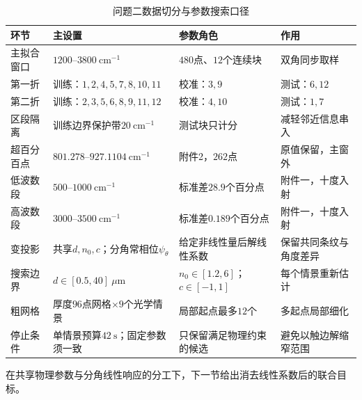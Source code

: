 \begingroup
\scriptsize
\setlength{\tabcolsep}{2pt}
\begin{longtable}{>{\centering\arraybackslash}p{} >{\centering\arraybackslash}p{} >{\centering\arraybackslash}p{} >{\centering\arraybackslash}p{}}
\caption{问题二数据切分与参数搜索口径}\label{tab:05}\\
\hline
环节 & 主设置 & 参数角色 & 作用\\
\hline
主拟合窗口 & $1200$--$3800\ \mathrm{cm}^{-1}$ & $480$点、$12$个连续块 & 双角同步取样\\
第一折 & 训练：$1,2,4,5,7,8,10,11$ & 校准：$3,9$ & 测试：$6,12$\\
第二折 & 训练：$2,3,5,6,8,9,11,12$ & 校准：$4,10$ & 测试：$1,7$\\
区段隔离 & 训练边界保护带$20\ \mathrm{cm}^{-1}$ & 测试块只计分 & 减轻邻近信息串入\\
超百分百点 & $801.278$--$927.1104\ \mathrm{cm}^{-1}$ & 附件2，$262$点 & 原值保留，主窗外\\
低波数段 & $500$--$1000\ \mathrm{cm}^{-1}$ & 标准差$28.9$个百分点 & 附件一，十度入射\\
高波数段 & $3000$--$3500\ \mathrm{cm}^{-1}$ & 标准差$0.189$个百分点 & 附件一，十度入射\\
变投影 & 共享$d,n_0,c$；分角常相位$\psi_\theta$ & 给定非线性量后解线性系数 & 保留共同条纹与角度差异\\
搜索边界 & $d\in[0.5,40]\ \mu\mathrm{m}$ & $n_0\in[1.2,6]$；$c\in[-1,1]$ & 每个情景重新估计\\
粗网格 & 厚度$96$点网格$\times9$个光学情景 & 局部起点最多$12$个 & 多起点局部细化\\
停止条件 & 单情景预算$42\ \mathrm{s}$；固定参数须一致 & 只保留满足物理约束的候选 & 避免以触边解缩窄范围\\
\hline
\end{longtable}
\endgroup

在共享物理参数与分角线性响应的分工下，下一节给出消去线性系数后的联合目标。
